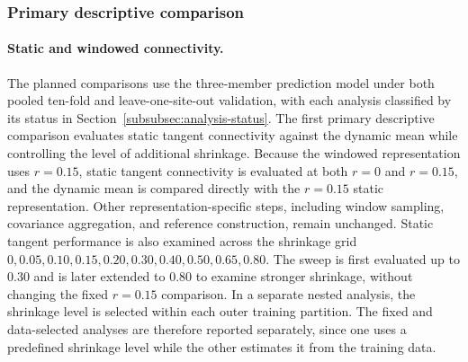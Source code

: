 \subsubsection{Primary descriptive comparison}
\label{subsubsec:primary-comparisons}

\paragraph{\textbf{Static and windowed connectivity.}}
\label{par:static-windowed}
The planned comparisons use the three-member prediction model under both pooled ten-fold and leave-one-site-out validation, with each analysis classified by its status in Section~\ref{subsubsec:analysis-status}. The first primary descriptive comparison evaluates static tangent connectivity against the dynamic mean while controlling the level of additional shrinkage. Because the windowed representation uses $r=0.15$, static tangent connectivity is evaluated at both $r=0$ and $r=0.15$, and the dynamic mean is compared directly with the $r=0.15$ static representation. Other representation-specific steps, including window sampling, covariance aggregation, and reference construction, remain unchanged. Static tangent performance is also examined across the shrinkage grid ${0,0.05,0.10,0.15,0.20,0.30,0.40,0.50,0.65,0.80}$. The sweep is first evaluated up to 0.30 and is later extended to 0.80 to examine stronger shrinkage, without changing the fixed $r=0.15$ comparison. In a separate nested analysis, the shrinkage level is selected within each outer training partition. The fixed and data-selected analyses are therefore reported separately, since one uses a predefined shrinkage level while the other estimates it from the training data.

